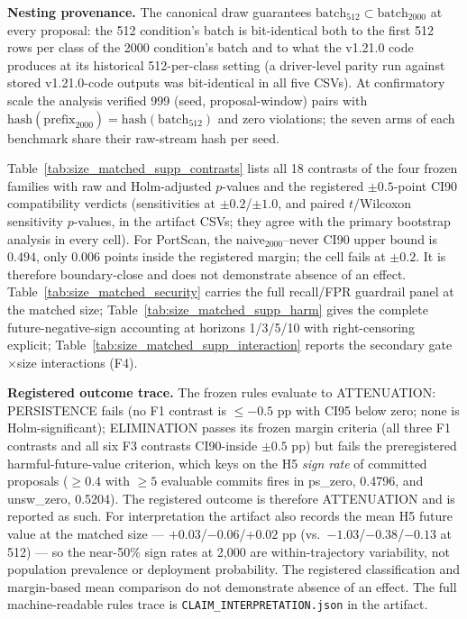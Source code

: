 \documentclass[a4paper,11pt]{article}
\begin{document}
\textbf{Nesting provenance.} The canonical draw guarantees
$\mathrm{batch}_{512} \subset \mathrm{batch}_{2000}$ at every proposal: the 512
condition's batch is bit-identical both to the first 512 rows per class of the 2000
condition's batch and to what the v1.21.0 code produces at its historical 512-per-class
setting (a driver-level parity run against stored
v1.21.0-code outputs was bit-identical in all five CSVs). At confirmatory scale the
analysis verified 999 (seed, proposal-window) pairs with
$\mathrm{hash}(\mathrm{prefix}_{2000}) = \mathrm{hash}(\mathrm{batch}_{512})$ and zero
violations; the seven arms of each benchmark share their raw-stream hash per seed.

Table~\ref{tab:size_matched_supp_contrasts} lists all 18 contrasts of the four frozen
families with raw and Holm-adjusted $p$-values and the registered $\pm0.5$-point CI90
compatibility verdicts (sensitivities at $\pm0.2$/$\pm1.0$, and paired $t$/Wilcoxon
sensitivity $p$-values, in the artifact CSVs; they agree with the primary bootstrap
analysis in every cell). For PortScan, the naive$_{2000}$--never CI90 upper bound is
$0.494$, only $0.006$ points inside the registered margin; the cell fails at $\pm0.2$.
It is therefore boundary-close and does not demonstrate absence of an effect.
Table~\ref{tab:size_matched_security} carries the full recall/FPR guardrail panel at
the matched size; Table~\ref{tab:size_matched_supp_harm} gives the complete
future-negative-sign accounting at horizons 1/3/5/10 with right-censoring explicit;
Table~\ref{tab:size_matched_supp_interaction} reports the secondary gate$\times$size
interactions (F4).

\textbf{Registered outcome trace.} The frozen rules evaluate to ATTENUATION:
PERSISTENCE fails (no F1 contrast is $\le -0.5$ pp with CI95 below zero; none is
Holm-significant); ELIMINATION passes its frozen margin criteria (all three F1 contrasts
and all six F3 contrasts CI90-inside $\pm0.5$ pp) but fails the preregistered
harmful-future-value criterion, which keys on the H5 \emph{sign rate} of committed
proposals ($\ge 0.4$ with $\ge 5$ evaluable commits fires in ps\_zero, 0.4796, and
unsw\_zero, 0.5204). The registered outcome is therefore ATTENUATION and is reported
as such. For interpretation the artifact also records the mean H5 future value at the
matched size --- $+0.03$/$-0.06$/$+0.02$ pp (vs.\ $-1.03$/$-0.38$/$-0.13$ at 512) ---
so the near-50\% sign rates at 2{,}000 are within-trajectory variability, not population
prevalence or deployment probability. The registered classification and margin-based
mean comparison do not demonstrate absence of an effect.
The full machine-readable rules trace is
\texttt{CLAIM\_INTERPRETATION.json} in the artifact.
\end{document}
